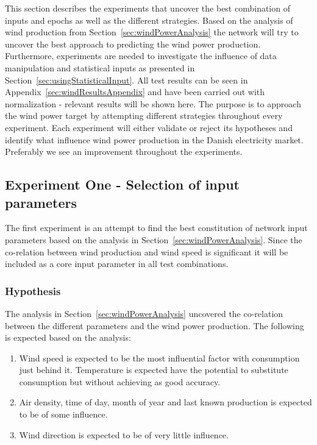 This section describes the experiments that uncover the best combination of inputs and epochs as well as the different strategies. Based on the analysis of wind production from Section~\ref{sec:windPowerAnalysis} the network will try to uncover the best approach to predicting the wind power production. Furthermore, experiments are needed to investigate the influence of data manipulation and statistical inputs as presented in Section~\ref{sec:usingStatisticalInput}. All test results can be seen in Appendix~\ref{sec:windResultsAppendix} and have been carried out with normalization - relevant results will be shown here. The purpose is to approach the wind power target by attempting different strategies throughout every experiment. Each experiment will either validate or reject its hypotheses and identify what influence wind power production in the Danish electricity market. Preferably we see an improvement throughout the experiments.


\subsection{Experiment One - Selection of input parameters}
\label{sec:windPowerExperimentOne}
The first experiment is an attempt to find the best constitution of network input parameters based on the analysis in Section~\ref{sec:windPowerAnalysis}. Since the co-relation between wind production and wind speed is significant it will be included as a core input parameter in all test combinations.

\subsubsection{Hypothesis}
The analysis in Section~\ref{sec:windPowerAnalysis} uncovered the co-relation between the different parameters and the wind power production. The following is expected based on the analysis:

\begin{enumerate}
\item Wind speed is expected to be the most influential factor with consumption just behind it. Temperature is expected have the potential to substitute consumption but without achieving as good accuracy. 
\item Air density, time of day, month of year and last known production is expected to be of some influence.
\item Wind direction is expected to be of very little influence.
\end{enumerate}

